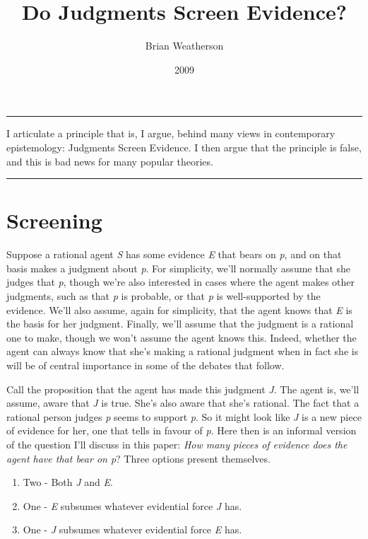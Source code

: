 \documentclass[
  10pt,
  letterpaper,
  DIV=11,
  numbers=noendperiod,
  twoside]{scrartcl}
\title{Do Judgments Screen Evidence?}
\author{Brian Weatherson}
\date{2009}
\providecommand{\tightlist}{%
  \setlength{\itemsep}{0pt}\setlength{\parskip}{0pt}}\usepackage{longtable,booktabs,array}
\renewenvironment{abstract}
 {\vspace{-1.25cm}
 \quotation\small\noindent\rule{\linewidth}{.5pt}\par\smallskip
 \noindent }
 {\par\noindent\rule{\linewidth}{.5pt}\endquotation}
\begin{document}
\maketitle
\begin{abstract}
I articulate a principle that is, I argue, behind many views in
contemporary epistemology: Judgments Screen Evidence. I then argue that
the principle is false, and this is bad news for many popular theories.
\end{abstract}

\section{Screening}\label{screening}

Suppose a rational agent \emph{S} has some evidence \emph{E} that bears
on \emph{p}, and on that basis makes a judgment about \emph{p}. For
simplicity, we'll normally assume that she judges that \emph{p}, though
we're also interested in cases where the agent makes other judgments,
such as that \emph{p} is probable, or that \emph{p} is well-supported by
the evidence. We'll also assume, again for simplicity, that the agent
knows that \emph{E} is the basis for her judgment. Finally, we'll assume
that the judgment is a rational one to make, though we won't assume the
agent knows this. Indeed, whether the agent can always know that she's
making a rational judgment when in fact she is will be of central
importance in some of the debates that follow.

Call the proposition that the agent has made this judgment \emph{J}. The
agent is, we'll assume, aware that \emph{J} is true. She's also aware
that she's rational. The fact that a rational person judges \emph{p}
seems to support \emph{p}. So it might look like \emph{J} is a new piece
of evidence for her, one that tells in favour of \emph{p}. Here then is
an informal version of the question I'll discuss in this paper:
\emph{How many pieces of evidence does the agent have that bear on p}?
Three options present themselves.

\begin{enumerate}
\def\labelenumi{\arabic{enumi}.}
\tightlist
\item
  Two - Both \emph{J} and \emph{E}.
\item
  One - \emph{E} subsumes whatever evidential force \emph{J} has.
\item
  One - \emph{J} subsumes whatever evidential force \emph{E} has.
\end{enumerate}
\end{document}

